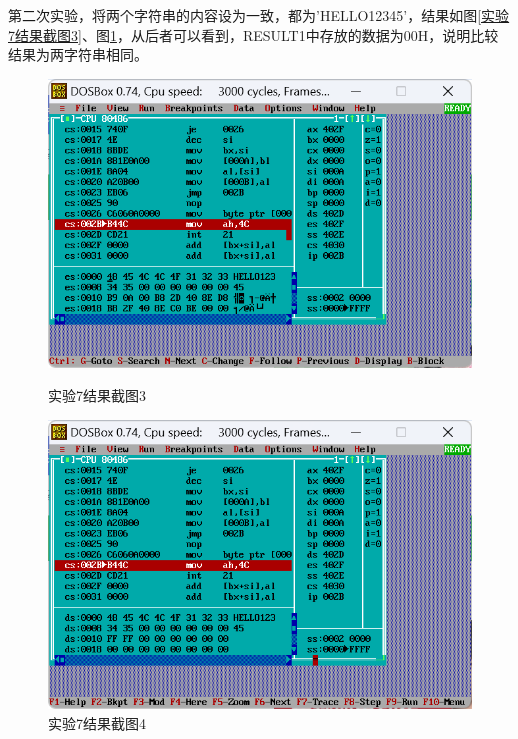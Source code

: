 \documentclass[12pt, a4paper, oneside]{ctexart}
\begin{document}
第二次实验，将两个字符串的内容设为一致，都为'HELLO12345'，结果如图\ref{实验7结果截图3}、图\ref{实验7结果截图4}，从后者可以看到，RESULT1中存放的数据为00H，说明比较结果为两字符串相同。
\begin{figure}[H]
    \centering
    \begin{minipage}{0.45\textwidth}
    \centering
    \includegraphics[scale=0.35]{pic/exp1_7_2es_segment.png}
    \caption{实验7结果截图3}
    \label{实验7结果截图3}
    \end{minipage}
    \hspace{0.05\textwidth}
    \begin{minipage}{0.45\textwidth}
    \centering
    \includegraphics[scale=0.35]{pic/exp1_7_2equal.png}
    \caption{实验7结果截图4}
    \label{实验7结果截图4}
    \end{minipage}
\end{figure}
\end{document}
